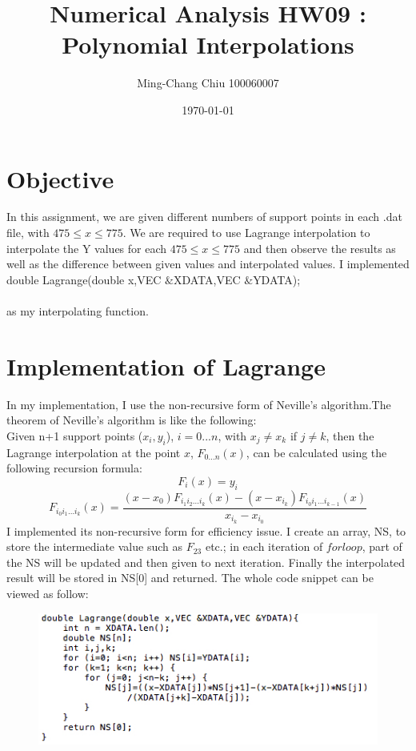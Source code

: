 \documentclass[12pt,a4paper]{article}
\title{Numerical Analysis HW09 : Polynomial Interpolations}
\author{Ming-Chang Chiu 100060007}
\date{\today}
\begin{document}
\maketitle
\fontsize{12}{20pt}\selectfont %

\section{Objective}
In this assignment, we are given different numbers of support points in each .dat file, with $475 \le x \le 775$. We are required to use Lagrange interpolation to interpolate the Y values for each $475 \le x \le 775$ and then observe the results as well as the difference between given values and interpolated values. I implemented\\ 

double Lagrange(double x,VEC $\&$XDATA,VEC $\&$YDATA);\\\\
as my interpolating function.

\section{Implementation of Lagrange}
In my implementation, I use the non-recursive form of Neville's algorithm.The theorem of Neville's algorithm is like the following:\\ Given n+1 support points ($x_i,y_i$), $i=0...n$, with $x_j \neq x_k$ if $j \neq k$, then the Lagrange interpolation at the point $x$, $F_{0 \dotsc n}\left( x \right)$, can be calculated using the following recursion formula:\\	
$$F_{i}\left( x \right) = y_i$$
$$F_{{i_0}{i_1}\dotsc{i_k}}(x) = \frac{ (x-x_0)F_{{i_1}{i_2}\dotsc{i_k}}(x)  -  (x-x_{i_k})F_{{i_0}{i_1}\dotsc{i_{k-1}}}(x) }{ x_{i_k} - x_{i_0} }$$
I implemented its non-recursive form for efficiency issue. I create an array, NS, to store the intermediate value such as $F_{23}$ etc.; in each iteration of $for loop$, part of the NS will be updated and then given to next iteration. Finally the interpolated result will be stored in NS[0] and returned. The whole code snippet can be viewed as follow:
\begin{figure}[H]
  \centering
      \includegraphics[width=1\textwidth]{./lagr.jpg}
\end{figure}
\end{document}
